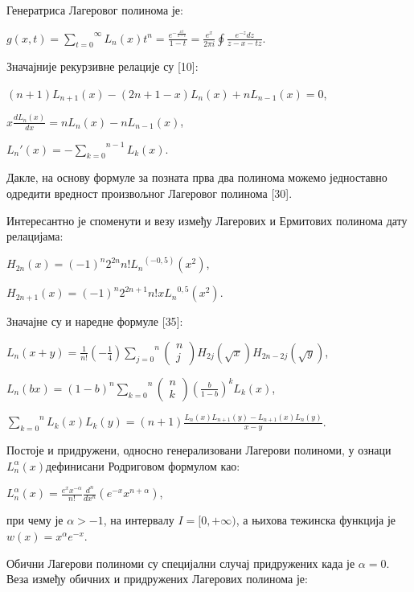 Генератриса Лагеровог полинома је:

\(g(x,t) = \overset{\infty}{\sum_{t = 0}}L_{n}(x)t^{n} = \frac{e^{- \frac{xt}{1 - t}}}{1 - t} = \frac{e^{x}}{2\pi i}\oint\frac{e^{- z}dz}{z - x - tz}\).

Значајније рекурзивне релације су {[}10{]}:

\((n + 1)L_{n + 1}(x) - (2n + 1 - x)L_{n}(x) + nL_{n - 1}(x) = 0\),

\(x\frac{dL_{n}(x)}{dx} = nL_{n}(x) - nL_{n - 1}(x)\),

\(L_{n}'(x) = - \overset{n - 1}{\sum_{k = 0}}L_{k}(x)\).

Дакле, на основу формуле за позната прва два полинома можемо једноставно
одредити вредност произвољног Лагеровог полинома {[}30{]}.

Интересантно је споменути и везу између Лагерових и Ермитових полинома
дату релацијама:

\(H_{2n}(x) = {( - 1)}^{n}2^{2n}n!{L_{n}}^{( - 0,5)}(x^{2})\),

\(H_{2n + 1}(x) = {( - 1)}^{n}2^{2n + 1}n!x{L_{n}}^{0,5}(x^{2})\).

Значајне су и наредне формуле {[}35{]}:

\(L_{n}(x + y) = \frac{1}{n!}( - \frac{1}{4})\overset{n}{\sum_{j = 0}}\left( \begin{array}{r}
n \\
j
\end{array} \right)H_{2j}(\sqrt{x})H_{2n - 2j}(\sqrt{y})\),

\(L_{n}(bx) = {(1 - b)}^{n}\overset{n}{\sum_{k = 0}}\left( \begin{array}{r}
n \\
k
\end{array} \right)\left( \frac{b}{1 - b} \right)^{k}L_{k}(x)\),

\(\overset{n}{\sum_{k = 0}}L_{k}(x)L_{k}(y) = (n + 1)\frac{L_{n}(x)L_{n + 1}(y) - L_{n + 1}(x)L_{n}(y)}{x - y}\).

Постоје и придружени, односно генерализовани Лагерови полиноми, у ознаци
\(L_{n}^{\alpha}(x)\)дефинисани Родриговом формулом као:

\(L_{n}^{\alpha}(x) = \frac{e^{x}x^{- \alpha}}{n!}\frac{d^{n}}{dx^{n}}(e^{- x}x^{n + \alpha})\),

при чему је \(\alpha > - 1\), на интервалу \(I = \lbrack 0, + \infty)\),
а њихова тежинска функција је \(w(x) = x^{\alpha}e^{- x}\).

Обични Лагерови полиноми су специјални случај придружених када је
\(\alpha = 0\). Веза између обичних и придружених Лагерових полинома је:

